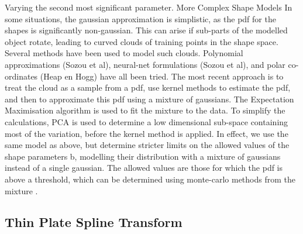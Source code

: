 Varying the second most significant parameter.
More Complex Shape Models
In some situations, the gaussian approximation is simplistic, as the pdf for the shapes is significantly non-gaussian. This can arise if sub-parts of the modelled object rotate, leading to curved clouds of training points in the shape space. Several methods have been used to model such clouds. Polynomial approximations (Sozou et al), neural-net formulations (Sozou et al), and polar co-ordinates (Heap en Hogg) have all been tried. The most recent approach is to treat the cloud as a sample from a pdf, use kernel methods to estimate the pdf, and then to approximate this pdf using a mixture of gaussians. The Expectation Maximisation algorithm is used to fit the mixture to the data. To simplify the calculations, PCA is used to determine a low dimensional sub-space containing most of the variation, before the kernel method is applied. In effect, we use the same model as above, but determine stricter limits on the allowed values of the shape parameters b, modelling their distribution with a mixture of gaussians instead of a single gaussian. The allowed values are those for which the pdf is above a threshold, which can be determined using monte-carlo methods from the mixture .


\subsection{Thin Plate Spline Transform}
